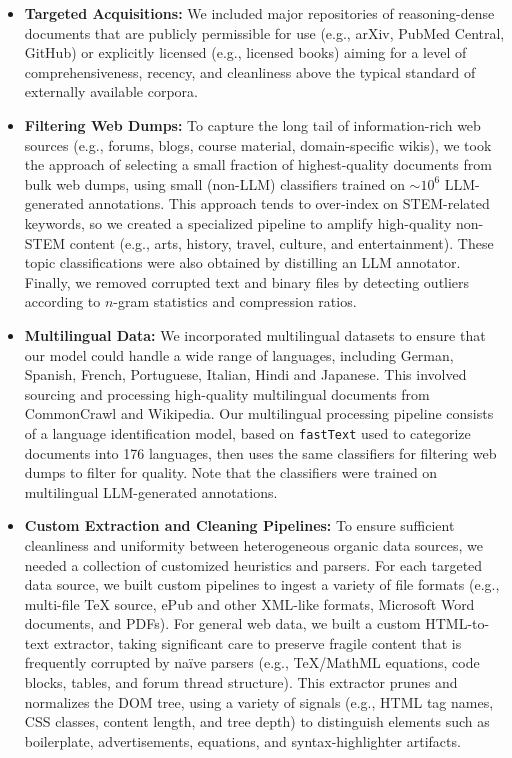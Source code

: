 \documentclass[11pt]{article}
\begin{document}
\begin{itemize}
\item \textbf{Targeted Acquisitions:} We included major repositories of reasoning-dense documents that are publicly permissible for use (e.g., arXiv, PubMed Central, GitHub) or explicitly licensed (e.g., licensed books) aiming for a level of comprehensiveness, recency, and cleanliness above the typical standard of externally available corpora. 
\item \textbf{Filtering Web Dumps:} To capture the long tail of information-rich web sources (e.g., forums, blogs, course material, domain-specific wikis), we took the approach of selecting a small fraction of highest-quality documents from bulk web dumps, using small (non-LLM) classifiers trained on $\sim10^6$ LLM-generated annotations. This approach tends to over-index on STEM-related keywords, so we created a specialized pipeline to amplify high-quality non-STEM content (e.g., arts, history, travel, culture, and entertainment). These topic classifications were also obtained by distilling an LLM annotator. Finally, we removed corrupted text and binary files by detecting outliers according to $n$-gram statistics and compression ratios.
\item \textbf{Multilingual Data:} We incorporated multilingual datasets to ensure that our model could handle a wide range of languages, including German, Spanish, French, Portuguese, Italian, Hindi and Japanese. This involved sourcing and processing high-quality multilingual documents from CommonCrawl and Wikipedia. Our multilingual processing pipeline consists of a language identification model, based on \texttt{fastText} used to categorize documents into 176 languages, then uses the same classifiers for filtering web dumps to filter for quality. Note that the classifiers were trained on multilingual LLM-generated annotations.


\item \textbf{Custom Extraction and Cleaning Pipelines:} To ensure sufficient cleanliness and uniformity between heterogeneous organic data sources, we needed a collection of customized heuristics and parsers. For each targeted data source, we built custom pipelines to ingest a variety of file formats (e.g., multi-file TeX source, ePub and other XML-like formats, Microsoft Word documents, and PDFs). For general web data, we built a custom HTML-to-text extractor, taking significant care to preserve fragile content that is frequently corrupted by na\"ive parsers (e.g., TeX/MathML equations, code blocks, tables, and forum thread structure). This extractor prunes and normalizes the DOM tree, using a variety of signals (e.g., HTML tag names, CSS classes, content length, and tree depth) to distinguish elements such as boilerplate, advertisements, equations, and syntax-highlighter artifacts.
\end{itemize}
\end{document}
